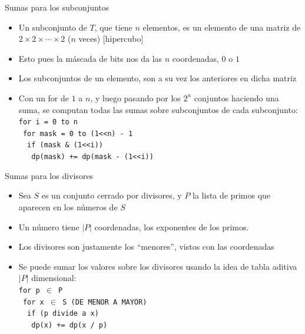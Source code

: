 \documentclass{beamer}
\begin{document}
\begin{frame}{Sumas para los subconjuntos}
    \begin{itemize}
		\item Un subconjunto de $T$, que tiene $n$ elementos, es un elemento de una matriz de $2 \times 2 \times \cdots \times 2$ ($n$ veces) [hipercubo]
        \item Esto pues la máscada de bits nos da las $n$ coordenadas, $0$ o $1$
        \item Los subconjuntos de un elemento, son a su vez los anteriores en dicha matriz
        \item Con un for de $1$ a $n$, y luego pasando por los $2^n$ conjuntos haciendo una suma, se computan todas las sumas sobre subconjuntos de
        cada subconjunto: \\
        \texttt{for i = 0 to n}\\
        \texttt{\ for mask = 0 to (1<<n) - 1}\\
        \texttt{\ \ if (mask \& (1<<i))}\\
        \texttt{\ \ \ dp(mask) += dp(mask - (1<<i))}\\
        
    \end{itemize}
\end{frame}

\begin{frame}{Sumas para los divisores}
    \begin{itemize}
		\item Sea $S$ es un conjunto cerrado por divisores, y $P$ la lista de primos que aparecen en los números de $S$
        \item Un número tiene $|P|$ coordenadas, los exponentes de los primos.
        \item Los divisores son justamente los ``menores'', vistos con las coordenadas
        \item Se puede sumar los valores sobre los divisores usando la idea de tabla aditiva $|P|$ dimensional:\\
        \texttt{for p $\in$ P}\\
        \texttt{\ for x $\in$ S (DE MENOR A MAYOR)}\\
        \texttt{\ \ if (p divide a x)}\\
        \texttt{\ \ \ dp(x) += dp(x / p)}\\
        
    \end{itemize}
\end{frame}
\end{document}

